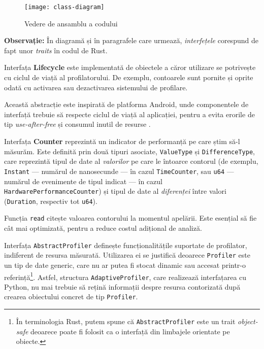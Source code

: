 \begin{figure}[h]
    \centering
    \texttt{[image: class-diagram]}
    \caption{Vedere de ansamblu a codului}
    \label{fig:class-diagram}
\end{figure}

\textbf{Observație:} În diagramă și în paragrafele care urmează, \textit{interfețele} corespund de fapt unor \textit{traits} în codul de Rust.

\medskip

Interfața \textbf{Lifecycle} este implementată de obiectele a căror utilizare se potrivește cu ciclul de viață al profilatorului. De exemplu, contoarele sunt pornite și oprite odată cu activarea sau dezactivarea sistemului de profilare.

Această abstracție este inspirată de platforma Android, unde componentele de interfață trebuie să respecte ciclul de viață al aplicației, pentru a evita erorile de tip \textit{use-after-free} și consumul inutil de resurse \cite{android_lifecycle}.

Interfața \textbf{Counter} reprezintă un indicator de performanță pe care știm să-l măsurăm. Este definită prin două tipuri asociate, \texttt{ValueType} și \texttt{DifferenceType}, care reprezintă tipul de date al \textit{valorilor} pe care le întoarce contorul (de exemplu, \texttt{Instant} --- numărul de nanosecunde --- în cazul \texttt{TimeCounter}, sau \texttt{u64} --- numărul de evenimente de tipul indicat --- în cazul \texttt{HardwarePerformanceCounter}) și tipul de date al \textit{diferenței} între valori (\texttt{Duration}, respectiv tot \texttt{u64}).

Funcția \texttt{read} citește valoarea contorului la momentul apelării. Este esențial să fie cât mai optimizată, pentru a reduce costul adițional de analiză.

Interfața \texttt{AbstractProfiler} definește funcționalitățile suportate de profilator, indiferent de resursa măsurată. Utilizarea ei se justifică deoarece \texttt{Profiler} este un tip de date generic, care nu ar putea fi stocat dinamic sau accesat printr-o referință\footnote{În terminologia Rust, putem spune că \texttt{AbstractProfiler} este un trait \emph{object-safe} deoarece poate fi folosit ca o interfață din limbajele orientate pe obiecte.}. Astfel, structura \texttt{AdaptiveProfiler}, care realizează interfațarea cu Python, nu mai trebuie să rețină informații despre resursa contorizată după crearea obiectului concret de tip \texttt{Profiler}.


